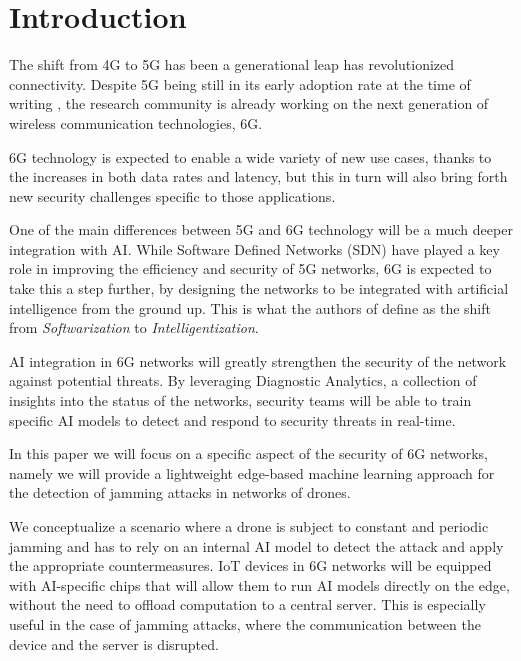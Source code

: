 \documentclass[futureinternet,article,submit,pdftex,moreauthors]{Definitions/mdpi}
\begin{document}
\section{Introduction}

The shift from 4G to 5G has been a generational leap has revolutionized connectivity. 
Despite 5G being still in its early adoption rate at the time of writing \cite{5GStatisticsTaylor}, the research community is already working on the next generation of wireless communication technologies, 6G. 

6G technology is expected to enable a wide variety of new use cases, thanks to the increases in both data rates and latency, but this in turn 
will also bring forth new security challenges specific to those applications. 

One of the main differences between 5G and 6G technology will be a much deeper integration with AI. While Software Defined Networks (SDN) have played a key role in improving the efficiency and security 
of 5G networks, 6G is expected to take this a step further, by designing the networks to be integrated with artificial intelligence from the ground up. This is what the authors of \cite{6GRoadmapLetaief} define as 
the shift from \textit{Softwarization} to \textit{Intelligentization}.

AI integration in 6G networks will greatly strengthen the security of the network against potential threats. 
By leveraging Diagnostic Analytics, a collection of insights into the status of the networks, security teams 
will be able to train specific AI models to detect and respond to security threats in real-time.

In this paper we will focus on a specific aspect of the security of 6G networks, namely we will provide a lightweight edge-based machine learning approach 
for the detection of jamming attacks in networks of drones.

We conceptualize a scenario where a drone is subject to constant and periodic jamming and has to rely on an internal AI model to detect the attack and apply the appropriate countermeasures. IoT devices in 6G networks
will be equipped with AI-specific chips that will allow them to run AI models directly on the edge, without the need to offload computation to a central server. This is especially useful in the case of jamming attacks, where the communication between the device and the server is disrupted.
\end{document}
